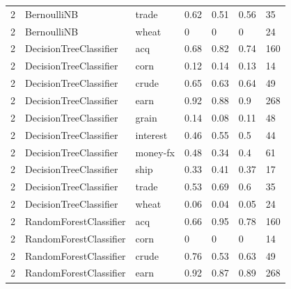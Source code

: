 \documentclass{article}
\begin{document}
\begin{table}[h]
\begin{tabular}{lllllll}
2             & BernoulliNB            & trade           & 0.62               & 0.51            & 0.56              & 35               \\
2             & BernoulliNB            & wheat           & 0                  & 0               & 0                 & 24               \\
2             & DecisionTreeClassifier & acq             & 0.68               & 0.82            & 0.74              & 160              \\
2             & DecisionTreeClassifier & corn            & 0.12               & 0.14            & 0.13              & 14               \\
2             & DecisionTreeClassifier & crude           & 0.65               & 0.63            & 0.64              & 49               \\
2             & DecisionTreeClassifier & earn            & 0.92               & 0.88            & 0.9               & 268              \\
2             & DecisionTreeClassifier & grain           & 0.14               & 0.08            & 0.11              & 48               \\
2             & DecisionTreeClassifier & interest        & 0.46               & 0.55            & 0.5               & 44               \\
2             & DecisionTreeClassifier & money-fx        & 0.48               & 0.34            & 0.4               & 61               \\
2             & DecisionTreeClassifier & ship            & 0.33               & 0.41            & 0.37              & 17               \\
2             & DecisionTreeClassifier & trade           & 0.53               & 0.69            & 0.6               & 35               \\
2             & DecisionTreeClassifier & wheat           & 0.06               & 0.04            & 0.05              & 24               \\
2             & RandomForestClassifier & acq             & 0.66               & 0.95            & 0.78              & 160              \\
2             & RandomForestClassifier & corn            & 0                  & 0               & 0                 & 14               \\
2             & RandomForestClassifier & crude           & 0.76               & 0.53            & 0.63              & 49               \\
2             & RandomForestClassifier & earn            & 0.92               & 0.87            & 0.89              & 268              \\\end{tabular}
\end{table}
\end{document}
